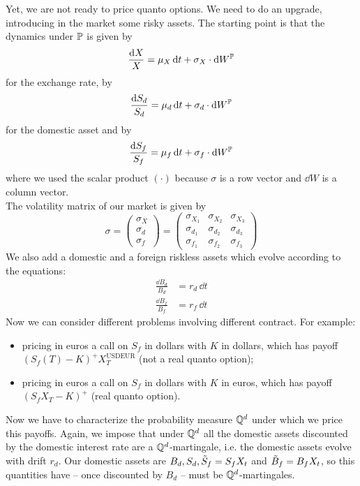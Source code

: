 Yet, we are not ready to price quanto options. We need to do an upgrade, introducing in the market some risky assets. The starting point is that the dynamics under $\mathbb{P}$ is given by
\begin{equation}
    \frac{\dd X}{X} = \mu_X\,\dd t + \sigma_X\cdot\dd W^{\mathbb{P}}
\end{equation}
for the exchange rate, by
\begin{equation}\label{Sd}
    \frac{\dd S_d}{S_d} = \mu_d\,\dd t + \sigma_d\cdot\dd W^{\mathbb{P}}
\end{equation}\label{Sf}
for the domestic asset and by
\begin{equation}
    \frac{\dd S_f}{S_f} = \mu_f\,\dd t + \sigma_f\cdot\dd W^{\mathbb{P}}
\end{equation}
where we used the scalar product $(\cdot)$ because $\sigma$ is a row vector and $\dd W$ is a column vector.\\
The volatility matrix of our market is given by
\begin{equation}
    \sigma = 
    \begin{pmatrix}
    \sigma_X \\ \sigma_d \\ \sigma_f
    \end{pmatrix} =
    \begin{pmatrix}
    \sigma_{X_1} & \sigma_{X_2} & \sigma_{X_3} \\
    \sigma_{d_1} & \sigma_{d_2} & \sigma_{d_3} \\
    \sigma_{f_1} & \sigma_{f_2} & \sigma_{f_3} 
    \end{pmatrix}
\end{equation}
We also add a domestic and a foreign riskless assets which evolve according to the equations:
\begin{align}
    \frac{\dd B_d}{B_d} &= r_d\,\dd t \\
    \frac{\dd B_f}{B_f} &= r_f\,\dd t
\end{align}
Now we can consider different problems involving different contract. For example:
\begin{itemize}
    \item pricing in euros a call on $S_f$ in dollars with $K$ in dollars, which has payoff $(S_f(T)-K)^+X_T^{\text{USDEUR}}$ (not a real quanto option);
    \item pricing in euros a call on $S_f$ in dollars with $K$ in euros, which has payoff $(S_fX_T-K)^+$ (real quanto option).
\end{itemize}
Now we have to characterize the probability measure $\mathbb{Q}^d$ under which we price this payoffs. Again, we impose that under $\mathbb{Q}^d$ all the domestic assets discounted by the domestic interest rate are a $\mathbb{Q}^d$-martingale, i.e. the domestic assets evolve with drift $r_d$. Our domestic assets are $B_d, S_d, \Tilde{S}_f = S_fX_t$ and $\Tilde{B}_f = B_fX_t$, so this quantities have -- once discounted by $B_d$ -- must be $\mathbb{Q}^d$-martingales.\\
